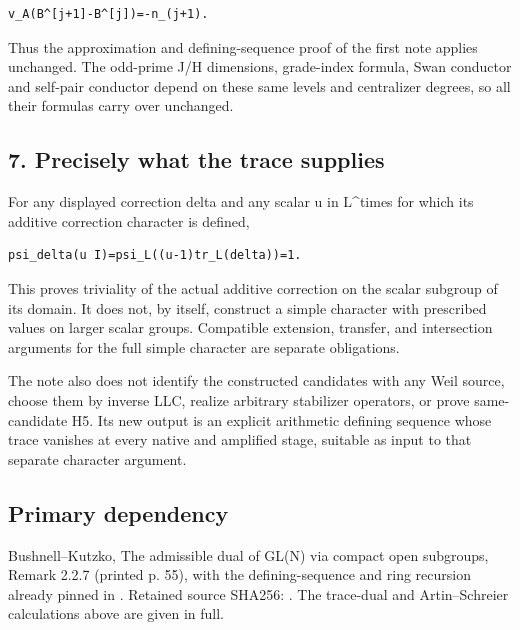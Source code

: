 \begin{Verbatim}[fontsize=\small,breaklines=true,breakanywhere=true]
v_A(B^[j+1]-B^[j])=-n_(j+1).
\end{Verbatim}

Thus the approximation and defining-sequence proof of the first note
applies unchanged. The odd-prime J/H dimensions, grade-index formula,
Swan conductor and self-pair conductor depend on these same levels and
centralizer degrees, so all their formulas carry over unchanged.

\hypertarget{odd_tower-precisely-what-the-trace-supplies}{%
\subsection{7. Precisely what the trace
supplies}\label{odd_tower-precisely-what-the-trace-supplies}}

For any displayed correction delta and any scalar u in L\^{}times for
which its additive correction character is defined,

\begin{Verbatim}[fontsize=\small,breaklines=true,breakanywhere=true]
psi_delta(u I)=psi_L((u-1)tr_L(delta))=1.
\end{Verbatim}

This proves triviality of the actual additive correction on the scalar
subgroup of its domain. It does not, by itself, construct a simple
character with prescribed values on larger scalar groups. Compatible
extension, transfer, and intersection arguments for the full simple
character are separate obligations.

The note also does not identify the constructed candidates with any Weil
source, choose them by inverse LLC, realize arbitrary stabilizer
operators, or prove same-candidate H5. Its new output is an explicit
arithmetic defining sequence whose trace vanishes at every native and
amplified stage, suitable as input to that separate character argument.

\hypertarget{odd_tower-primary-dependency}{%
\subsection{Primary dependency}\label{odd_tower-primary-dependency}}

Bushnell--Kutzko, The admissible dual of GL(N) via compact open
subgroups, Remark 2.2.7 (printed p. 55), with the defining-sequence and
ring recursion already pinned in . Retained source
SHA256:
. The
trace-dual and Artin--Schreier calculations above are given in full.

